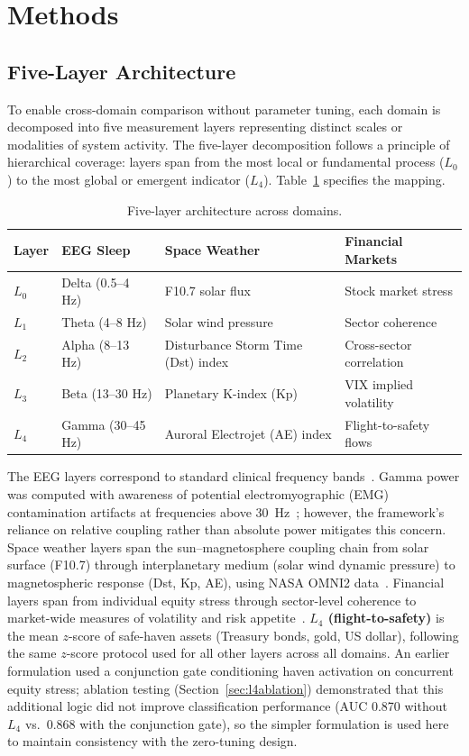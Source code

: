 \documentclass[aip,cha,reprint,amsmath,amssymb]{revtex4-2}
\begin{document}
\section{Methods}

\subsection{Five-Layer Architecture}

To enable cross-domain comparison without parameter tuning, each domain is decomposed into five measurement layers representing distinct scales or modalities of system activity. The five-layer decomposition follows a principle of hierarchical coverage: layers span from the most local or fundamental process ($L_0$) to the most global or emergent indicator ($L_4$). Table~\ref{tab:layers} specifies the mapping.

\begin{table}[h]
\caption{\label{tab:layers}Five-layer architecture across domains.}
\centering
\begin{tabular}{llll}
Layer & EEG Sleep & Space Weather & Financial Markets \\
\hline
$L_0$ & Delta (0.5--4 Hz) & F10.7 solar flux & Stock market stress \\
$L_1$ & Theta (4--8 Hz) & Solar wind pressure & Sector coherence \\
$L_2$ & Alpha (8--13 Hz) & Disturbance Storm Time (Dst) index & Cross-sector correlation \\
$L_3$ & Beta (13--30 Hz) & Planetary K-index (Kp) & VIX implied volatility \\
$L_4$ & Gamma (30--45 Hz) & Auroral Electrojet (AE) index & Flight-to-safety flows \\
\end{tabular}
\end{table}

The EEG layers correspond to standard clinical frequency bands~\cite{berry2017,oppenheim1997}. Gamma power was computed with awareness of potential electromyographic (EMG) contamination artifacts at frequencies above 30~Hz~\cite{muthukumaraswamy2013}; however, the framework's reliance on relative coupling rather than absolute power mitigates this concern. Space weather layers span the sun--magnetosphere coupling chain from solar surface (F10.7) through interplanetary medium (solar wind dynamic pressure) to magnetospheric response (Dst, Kp, AE), using NASA OMNI2 data~\cite{papitashvili2020}. Financial layers span from individual equity stress through sector-level coherence to market-wide measures of volatility and risk appetite~\cite{forbes2002}. \textbf{$L_4$ (flight-to-safety)} is the mean $z$-score of safe-haven assets (Treasury bonds, gold, US dollar), following the same $z$-score protocol used for all other layers across all domains. An earlier formulation used a conjunction gate conditioning haven activation on concurrent equity stress; ablation testing (Section~\ref{sec:l4ablation}) demonstrated that this additional logic did not improve classification performance (AUC 0.870 without $L_4$ vs.\ 0.868 with the conjunction gate), so the simpler formulation is used here to maintain consistency with the zero-tuning design.
\end{document}
